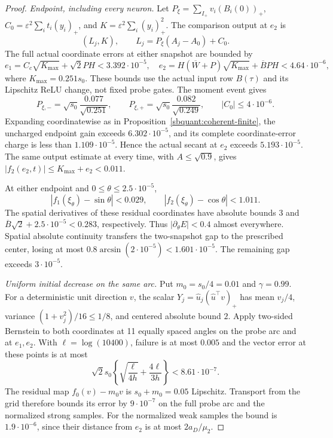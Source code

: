 \documentclass{article} %
\theoremstyle{plain}
\theoremstyle{definition}
\theoremstyle{remark}
\begin{document}
\begin{proof}
\emph{Endpoint, including every neuron.}
Let $P_\xi=\sum_{I_+}v_i(B_i(0))_+$,
$C_0=\varepsilon^2\sum_i t_i(y_i)_+$, and
$K=\varepsilon^2\sum_i(y_i)_+^2$.
The comparison output at $e_2$ is
\[
 (L_j,K),\qquad L_j=P_\xi(A_j-A_0)+C_0.
\]
The full actual coordinate errors at either snapshot are bounded by
\[
 e_1=C_c\sqrt{K_{\max}}+\sqrt2PH<3.392\cdot10^{-5},
 \quad
 e_2=H(\overline W+P)\sqrt{K_{\max}}+\overline BPH
       <4.64\cdot10^{-6},
\]
where $K_{\max}=0.251s_0$. These bounds use the actual input row
$B(\tau)$ and its Lipschitz ReLU change, not fixed probe gates.
The moment event gives
\[
 P_{\xi,-}=\sqrt{s_0}\frac{0.077}{\sqrt{0.251}},\qquad
 P_{\xi,+}=\sqrt{s_0}\frac{0.082}{\sqrt{0.249}},\qquad
 |C_0|\le4\cdot10^{-6}.
\]
Expanding coordinatewise as in
Proposition~\ref{sbquant:coherent-finite}, the uncharged endpoint gain
exceeds $6.302\cdot10^{-5}$, and its complete coordinate-error charge
is less than $1.109\cdot10^{-5}$. Hence the actual secant at $e_2$
exceeds $5.193\cdot10^{-5}$.
The same output estimate at every time, with $A\le\sqrt{0.9}$,
gives $|f_2(e_2,t)|\le K_{\max}+e_2<0.011$.

At either endpoint and $0\le\theta\le2.5\cdot10^{-5}$,
\[
 |f_1(\xi_\theta)-\sin\theta|<0.029,
 \qquad |f_2(\xi_\theta)-\cos\theta|<1.011.
\]
The spatial derivatives of these residual coordinates have absolute
bounds $3$ and $\overline B\sqrt2+2.5\cdot10^{-5}<0.283$, respectively.
Thus $|\partial_\theta E|<0.4$ almost everywhere. Spatial absolute
continuity transfers the two-snapshot gap to the prescribed center,
losing at most $0.8\arcsin(2\cdot10^{-5})<1.601\cdot10^{-5}$.
The remaining gap exceeds $3\cdot10^{-5}$.

\emph{Uniform initial decrease on the same arc.}
Put $m_0=s_0/4=0.01$ and $\gamma=0.99$.
For a deterministic unit direction $v$, the scalar
$Y_j=\widehat u_j(\widehat u^\top v)_+$ has mean $v_j/4$,
variance $(1+v_j^2)/16\le1/8$, and centered absolute bound $2$.
Apply two-sided Bernstein to both coordinates at 11 equally spaced
angles on the probe arc and at $e_1,e_2$. With
$\ell=\log(10400)$, failure is at most $0.005$ and the vector error
at these points is at most
\[
 \sqrt2s_0\left\{\sqrt{\frac\ell{4h}}+
                         \frac{4\ell}{3h}\right\}<8.61\cdot10^{-7}.
\]
The residual map $f_0(v)-m_0v$ is $s_0+m_0=0.05$ Lipschitz.
Transport from the grid therefore bounds its error by $9\cdot10^{-7}$
on the full probe arc and the normalized strong samples. For the
normalized weak samples the bound is $1.9\cdot10^{-6}$, since their
distance from $e_2$ is at most $2a_D/\mu_2$.


\end{proof}
\end{document}
